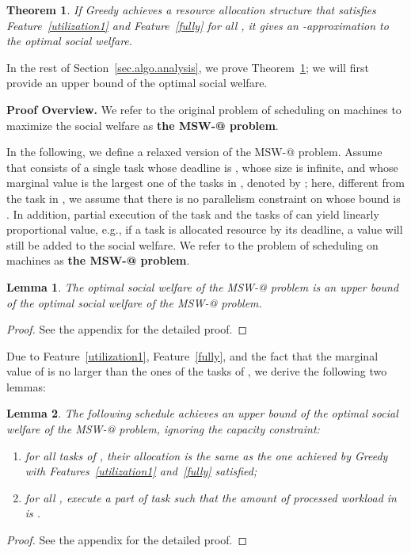 \documentclass[10pt,journal,compsoc]{IEEEtran}
\makeatletter
\newtheorem{theorem}{\textbf{Theorem}}\newtheorem{definition}{\textbf{Definition}}\newtheorem{feature}{Feature}\newtheorem{proposition}{\textbf{Proposition}}\newtheorem{lemma}{Lemma}\newtheorem{assumption}{Assumption}\newtheorem{principle}{\textbf{Principle}}\newtheorem{observation}{\textbf{{\em Observation}}}\newtheorem{property}{\textbf{{\em Property}}}
\newcommand{\Rmnum}[1]{\expandafter\@slowromancap\romannumeral #1@}
\makeatother
\begin{document}
\begin{theorem}\label{spaa}
If Greedy achieves a resource allocation structure that satisfies Feature~\ref{utilization1} and Feature~\ref{fully} for all , it gives an -approximation to the optimal social welfare.
\end{theorem}






In the rest of Section~\ref{sec.algo.analysis}, we prove Theorem~\ref{spaa}; we will first provide an upper bound of the optimal social welfare.


\vspace{0.45em}\noindent\textbf{Proof Overview.} We refer to the original problem of scheduling  on  machines to maximize the social welfare as \textbf{the MSW-\Rmnum{1} problem}.


In the following, we define a relaxed version of the MSW-\Rmnum{1} problem.
Assume that  consists of a single task  whose deadline is , whose size is infinite, and whose marginal value is the largest one of the tasks in , denoted by ; here, different from the task in , we assume that there is no parallelism constraint on  whose bound is . In addition, partial execution of the task  and the tasks of  can yield linearly proportional value, e.g., if a task  is allocated  resource by its deadline, a value  will still be added to the social welfare. We refer to the problem of scheduling  on  machines as \textbf{the MSW-\Rmnum{2} problem}.



\begin{lemma}\label{lemma-upper-bound-1}
The optimal social welfare of the MSW-\Rmnum{2} problem is an upper bound of the optimal social welfare of the MSW-\Rmnum{1} problem.
\end{lemma}
\begin{proof}
See the appendix for the detailed proof.
\end{proof}


Due to Feature~\ref{utilization1}, Feature~\ref{fully}, and the fact that the marginal value of  is no larger than the ones of the tasks of , we derive the following two lemmas:

\begin{lemma}\label{lemma-upper-bound-2}
The following schedule achieves an upper bound of the optimal social welfare of the MSW-\Rmnum{2} problem, ignoring the capacity constraint:
\begin{enumerate}

\item for all tasks of , their allocation is the same as the one achieved by Greedy with Features~\ref{utilization1} and~\ref{fully} satisfied;

\item for all , execute a part of task  such that the amount of processed workload in  is .
\end{enumerate}
\end{lemma}
\begin{proof}
See the appendix for the detailed proof.
\end{proof}
\end{document}
